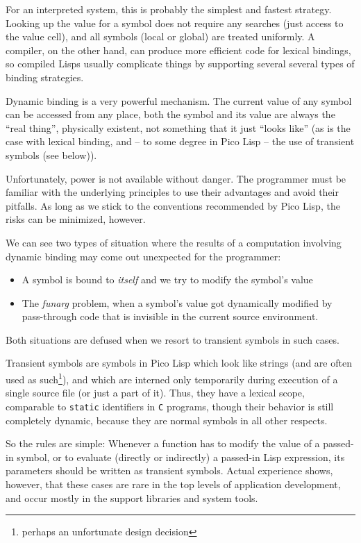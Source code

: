 For an interpreted system, this is probably the simplest and fastest strategy.
Looking up the value for a symbol does not require any searches (just access to
the value cell), and all symbols (local or global) are treated uniformly. A
compiler, on the other hand, can produce more efficient code for lexical
bindings, so compiled Lisps usually complicate things by supporting several
several types of binding strategies.

Dynamic binding is a very powerful mechanism. The current value of any symbol
can be accessed from any place, both the symbol and its value are always the
``real thing'', physically existent, not something that it just ``looks like''
(as is the case with lexical binding, and -- to some degree in Pico Lisp -- the
use of transient symbols (see below)).

Unfortunately, power is not available without danger. The programmer must be
familiar with the underlying principles to use their advantages and avoid their
pitfalls. As long as we stick to the conventions recommended by Pico Lisp, the
risks can be minimized, however.

We can see two types of situation where the results of a computation involving
dynamic binding may come out unexpected for the programmer:

\begin{itemize}

\item A symbol is bound to \emph{itself} and we try to modify the symbol's value

\item The \emph{funarg} problem, when a symbol's value got dynamically modified
by pass-through code that is invisible in the current source environment.

\end{itemize}

Both situations are defused when we resort to transient symbols in such cases.

Transient symbols are symbols in Pico Lisp which look like strings (and are
often used as such\footnote{perhaps an unfortunate design decision}), and which
are interned only temporarily during execution of a single source file (or just
a part of it). Thus, they have a lexical scope, comparable to \texttt{static}
identifiers in \texttt{C} programs, though their behavior is still completely
dynamic, because they are normal symbols in all other respects.

So the rules are simple: Whenever a function has to modify the value of a
passed-in symbol, or to evaluate (directly or indirectly) a passed-in Lisp
expression, its parameters should be written as transient symbols. Actual
experience shows, however, that these cases are rare in the top levels of
application development, and occur mostly in the support libraries and system
tools.


